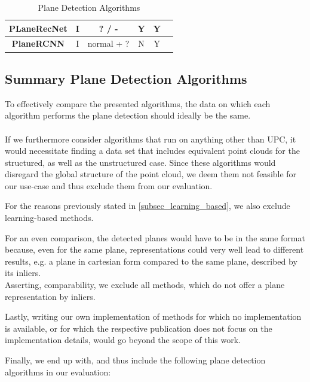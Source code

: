 \documentclass[main.tex]{subfiles}
\begin{document}
\begin{table}[!h]
\begin{tabular}{|c|c|c|c|c|c}
        \textbf{PLaneRecNet} \cite{Xie_Shu_Rambach_Pagani_Stricker_2022} & I                   & ? / -                                 & Y                       & Y                     \\ \hline
        \textbf{PlaneRCNN} \cite{Liu_Kim_Gu_Furukawa_Kautz_2019}         & I                   & normal + ?                            & N                       & Y                     \\ \hline
    \end{tabular}
    \caption{Plane Detection Algorithms}
    \label{tab:my-table}
\end{table}

\subsection*{Summary Plane Detection Algorithms}
To effectively compare the presented algorithms, the data on which each algorithm performs the plane detection should ideally be the same. \\ \\
If we furthermore consider algorithms that run on anything other than UPC, it would necessitate finding a data set that includes equivalent point clouds for the structured, as well as
the unstructured case.
Since these algorithms would disregard the global structure of the point cloud, we deem them not feasible for our use-case and thus exclude them from
our evaluation.

For the reasons previously stated in \ref{subsec_learning_based}, we also exclude learning-based methods.

For an even comparison, the detected planes would have to be in the same format because, even for the same plane, representations could very well
lead to different results, e.g. a plane in cartesian form compared to the same plane, described by its inliers.\\
Asserting, comparability, we exclude all methods, which do not offer a plane representation by inliers.

Lastly, writing our own implementation of methods for which no implementation is available, or for which the respective publication does not
focus on the implementation details, would go beyond the scope of this work.


Finally, we end up with, and thus include the following plane detection algorithms in our evaluation:
\end{document}
